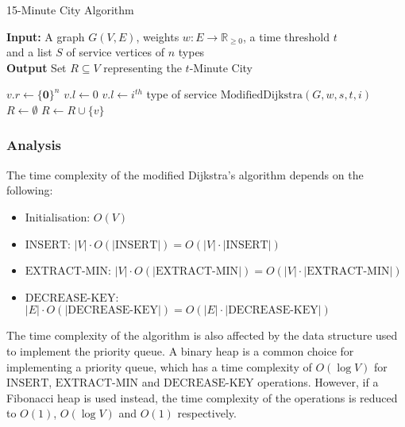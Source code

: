 \begin{algorithm}[H]
    \caption{15-Minute City Algorithm}\label{alg:15mc}
    \textbf{Input:} A graph $G(V,E)$, weights $w:E\rightarrow\mathbb{R}_{\geq 0}$, a time threshold $t$ \\  and a list $S$ of service vertices of $n$ types\\
    \textbf{Output} Set $R\subseteq V$ representing the $t$-Minute City
    \begin{algorithmic}
            \State $v.r \gets \{\mathbf{0}\}^{n}$
            \State $v.l \gets 0$
        \EndFor
            \State $v.l \gets i^{th}$ type of service
        \EndFor
                \State $\text{ModifiedDijkstra}(G,w,s,t,i)$
            \EndFor
        \EndFor
        \State $R\gets\emptyset$
                \State $R \gets R\cup \{v\}$
            \EndIf
        \EndFor
    \end{algorithmic}
\end{algorithm}

\subsubsection{Analysis}

The time complexity of the modified Dijkstra's algorithm depends on the following:

\begin{itemize}
    \item Initialisation: $O(V)$
    \item $\text{INSERT}$: $|V|\cdot O(|\text{INSERT}|)=O(|V|\cdot|\text{INSERT}|)$
    \item $\text{EXTRACT-MIN}$: $|V|\cdot O(|\text{EXTRACT-MIN}|)=O(|V|\cdot|\text{EXTRACT-MIN}|)$
    \item $\text{DECREASE-KEY}$: $|E|\cdot O(|\text{DECREASE-KEY}|)=O(|E|\cdot|\text{DECREASE-KEY}|)$
\end{itemize}

The time complexity of the algorithm is also affected by the data structure used to implement the priority queue. A binary heap is a common choice for implementing a priority queue, which has a time complexity of $O(\log V)$ for $\text{INSERT}$, $\text{EXTRACT-MIN}$ and $\text{DECREASE-KEY}$ operations. However, if a Fibonacci heap is used instead, the time complexity of the operations is reduced to $O(1)$, $O(\log V)$ and $O(1)$ respectively.

